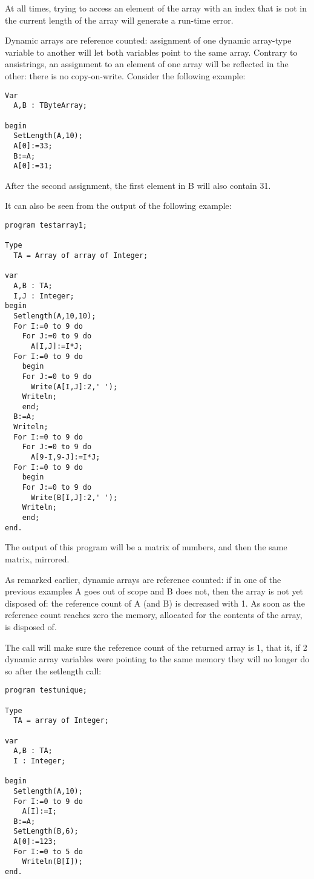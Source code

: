 At all times, trying to access an element of the array with an index 
that is not in the current length of the array will generate a run-time 
error.

Dynamic arrays are reference counted: assignment of one dynamic array-type 
variable to another will let both variables point to the same array. 
Contrary to ansistrings, an assignment to an element of one array will 
be reflected in the other: there is no copy-on-write. Consider the following
example:
\begin{verbatim}
Var
  A,B : TByteArray;

begin
  SetLength(A,10);
  A[0]:=33;
  B:=A;
  A[0]:=31;
\end{verbatim}
After the second assignment, the first element in B will also contain 31.

It can also be seen from the output of the following example:
\begin{verbatim}
program testarray1;

Type
  TA = Array of array of Integer;
  
var   
  A,B : TA;
  I,J : Integer;
begin
  Setlength(A,10,10);
  For I:=0 to 9 do
    For J:=0 to 9 do 
      A[I,J]:=I*J;
  For I:=0 to 9 do
    begin
    For J:=0 to 9 do 
      Write(A[I,J]:2,' ');
    Writeln;
    end;
  B:=A;
  Writeln;
  For I:=0 to 9 do
    For J:=0 to 9 do 
      A[9-I,9-J]:=I*J;
  For I:=0 to 9 do
    begin
    For J:=0 to 9 do 
      Write(B[I,J]:2,' ');
    Writeln;
    end;
end.  
\end{verbatim}
The output of this program will be a matrix of numbers, and then the same matrix, mirrored.

As remarked earlier, dynamic arrays are reference counted: if in one of the previous examples A
goes out of  scope and B does not, then the array is not yet disposed of: the
reference count of A (and B) is decreased with 1. As soon as the reference
count reaches zero the memory, allocated for the contents of the array, is disposed of.

The  call will make sure the reference count of the returned
array is 1, that it, if 2 dynamic array variables were pointing to the same
memory they will no longer do so after the setlength call:
\begin{verbatim}
program testunique;

Type
  TA = array of Integer;
  
var   
  A,B : TA;
  I : Integer;

begin
  Setlength(A,10);
  For I:=0 to 9 do
    A[I]:=I;
  B:=A;
  SetLength(B,6);    
  A[0]:=123;
  For I:=0 to 5 do
    Writeln(B[I]);
end.  
\end{verbatim}

